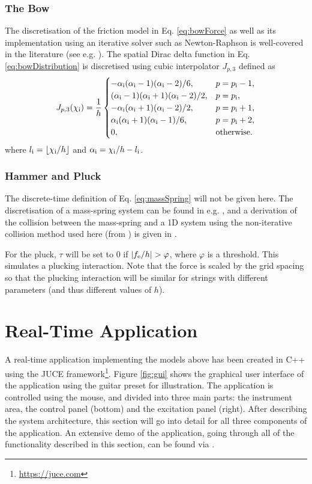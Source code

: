 \documentclass{article}
\begin{document}
\subsubsection{The Bow}
The discretisation of the friction model in Eq. \eqref{eq:bowForce} as well as its implementation using an iterative solver such as Newton-Raphson is well-covered in the literature (see e.g. \cite[Ch. 8]{WillemsenThesis}). The spatial Dirac delta function in Eq. \eqref{eq:bowDistribution} is discretised using cubic interpolator $J_{p,3}$ defined as
\begin{equation}\label{eq:cubicJ}
    J_{p,3}(\chi_{\text{i}}) = \frac{1}{h}\begin{cases}
        -\alpha_{\text{i}} (\alpha_{\text{i}}-1)(\alpha_{\text{i}}-2)/6, & p = p_{\text{i}}-1,\\
        (\alpha_{\text{i}}-1)(\alpha_{\text{i}}+1)(\alpha_{\text{i}}-2)/2,  & p = p_{\text{i}},\\
        -\alpha_{\text{i}} (\alpha_{\text{i}}+1)(\alpha_{\text{i}}-2)/2, & p = p_{\text{i}} + 1,\\
        \alpha_{\text{i}} (\alpha_{\text{i}}+1)(\alpha_{\text{i}}-1)/6, & p = p_{\text{i}} + 2,\\
        0, & \text{otherwise.}
    \end{cases}
\end{equation}
where $l_\itxt = \floor[\chi_\itxt / h]$ and $\alpha_{\text{i}} = \chi_{\text{i}} /h - l_{\text{i}}$.

\subsubsection{Hammer and Pluck}
The discrete-time definition of Eq. \eqref{eq:massSpring} will not be given here. The discretisation of a mass-spring system can be found in e.g. \cite{Bilbao2009Modular, Willemsen2020}, and a derivation of the collision between the mass-spring and a 1D system using the non-iterative collision method used here (from \cite{Ducceschi2021}) is given in \cite[Sec. 10.2]{WillemsenThesis}.

For the pluck, $\tau$ will be set to 0 if $|f_{\text{e}} / h| > \varphi$, where $\varphi$ is a threshold. This simulates a plucking interaction. Note that the force is scaled by the grid spacing so that the plucking interaction will be similar for strings with different parameters (and thus different values of $h$). 

\section{Real-Time Application}\label{sec:application}
A real-time application implementing the models above has been created in C++ using the JUCE framework\footnote{\url{https://juce.com}}. Figure \ref{fig:gui} shows the graphical user interface of the application using the guitar preset for illustration. The application is controlled using the mouse, and divided into three main parts: the instrument area, the control panel (bottom) and the excitation panel (right). After describing the system architecture, this section will go into detail for all three components of the application.
An extensive demo of the application, going through all of the functionality described in this section, can be found via \cite{demo}.
\end{document}
